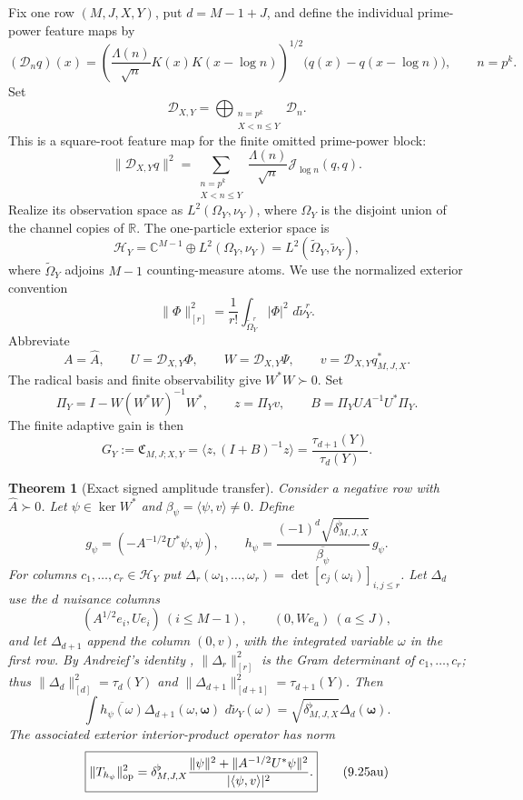 \documentclass[11pt]{amsart}
\newtheorem{theorem}{Theorem}[section]
\theoremstyle{definition}
\theoremstyle{remark}
\newcommand{\dd}{\,d}
\begin{document}
Fix one row \((M,J,X,Y)\), put \(d=M-1+J\), and define the individual
prime-power feature maps by
\[
 (\mathcal D_nq)(x)=
 \left(\frac{\Lambda(n)}{\sqrt n}K(x)K(x-\log n)\right)^{1/2}
 \bigl(q(x)-q(x-\log n)\bigr),
 \qquad n=p^k.
\]
Set
\[
 \mathcal D_{X,Y}=\bigoplus_{\substack{n=p^k\\X<n\le Y}}\mathcal D_n.
\]
This is a square-root feature map for the finite omitted prime-power
block:
\[
 \|\mathcal D_{X,Y}q\|^2
 =\sum_{\substack{n=p^k\\X<n\le Y}}
 \frac{\Lambda(n)}{\sqrt n}\mathcal J_{\log n}(q,q).
\tag{9.25ap}
\]
Realize its observation space as \(L^2(\Omega_Y,\nu_Y)\), where
\(\Omega_Y\) is the disjoint union of the channel copies of \(\mathbb R\).
The one-particle exterior space is
\[
 \mathcal H_Y=\mathbb C^{M-1}\oplus L^2(\Omega_Y,\nu_Y)
 =L^2(\widetilde\Omega_Y,\widetilde\nu_Y),
\]
where \(\widetilde\Omega_Y\) adjoins \(M-1\) counting-measure atoms.
We use the normalized exterior convention
\[
 \|\Phi\|_{[r]}^2=\frac1{r!}
 \int_{\widetilde\Omega_Y^r}|\Phi|^2\,\dd\widetilde\nu_Y^r.
\]
Abbreviate
\[
 A=\widehat A,\qquad
 U=\mathcal D_{X,Y}\Phi,\qquad
 W=\mathcal D_{X,Y}\Psi,\qquad
 v=\mathcal D_{X,Y}q_{M,J,X}^* .
\]
The radical basis and finite observability give \(W^*W\succ0\).  Set
\[
 \Pi_Y=I-W(W^*W)^{-1}W^*,\qquad
 z=\Pi_Yv,\qquad
 B=\Pi_YUA^{-1}U^*\Pi_Y .
\tag{9.25aq}
\]
The finite adaptive gain is then
\[
 \boxed{
 G_Y:=\mathfrak C_{M,J;X,Y}
 =\langle z,(I+B)^{-1}z\rangle
 =\frac{\tau_{d+1}(Y)}{\tau_d(Y)}.}
\tag{9.25ar}
\]

\begin{theorem}[Exact signed amplitude transfer]
\label{thm:signed-amplitude-transfer}
Consider a negative row with \(\widehat A\succ0\).
Let \(\psi\in\ker W^*\) and
\(\beta_\psi=\langle\psi,v\rangle\ne0\).  Define
\[
 g_\psi=(-A^{-1/2}U^*\psi,\psi),
 \qquad
 h_\psi=\frac{(-1)^d\sqrt{\delta^{\flat}_{M,J,X}}}
          {\overline{\beta_\psi}}\,g_\psi .
\tag{9.25as}
\]
For columns \(c_1,\dots,c_r\in\mathcal H_Y\) put
\(\Delta_r(\omega_1,\dots,\omega_r)=\det[c_j(\omega_i)]_{i,j\le r}\).
Let \(\Delta_d\) use the \(d\) nuisance columns
\[
 (A^{1/2}e_i,Ue_i)\ (i\le M-1),\qquad (0,We_a)\ (a\le J),
\]
and let \(\Delta_{d+1}\) append the column \((0,v)\), with the integrated
variable \(\omega\) in the first row.  By Andreief's identity
\cite{Andreief1886}, \(\|\Delta_r\|_{[r]}^2\) is the Gram determinant of
\(c_1,\dots,c_r\); thus \(\|\Delta_d\|_{[d]}^2=\tau_d(Y)\) and
\(\|\Delta_{d+1}\|_{[d+1]}^2=\tau_{d+1}(Y)\).  Then
\[
 \boxed{
 \int\overline{h_\psi(\omega)}
 \Delta_{d+1}(\omega,\boldsymbol\omega)\,
 \dd\widetilde\nu_Y(\omega)
 =\sqrt{\delta^{\flat}_{M,J,X}}\Delta_d(\boldsymbol\omega).}
\tag{9.25at}
\]
The associated exterior interior-product operator has norm
\[
 \boxed{
 \|T_{h_\psi}\|_{\rm op}^2
 =\delta^{\flat}_{M,J,X}
 \frac{\|\psi\|^2+\|A^{-1/2}U^*\psi\|^2}
  {|\langle\psi,v\rangle|^2}.}
\tag{9.25au}
\]
\end{theorem}
\end{document}
